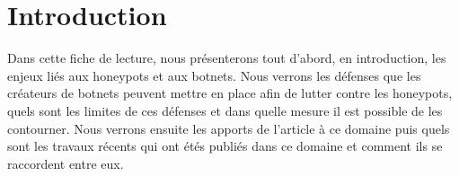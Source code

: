\chapter*{Introduction}


Dans cette fiche de lecture, nous présenterons tout d'abord, en introduction, les enjeux liés aux honeypots et aux
botnets. Nous verrons les défenses que les créateurs de botnets peuvent mettre en place afin
de lutter contre les honeypots, quels sont les limites de ces défenses et dans quelle mesure il est possible 
de les contourner. Nous verrons ensuite les apports de l'article à ce domaine puis quels sont les travaux récents
qui ont étés publiés dans ce domaine et comment ils se raccordent entre eux.
